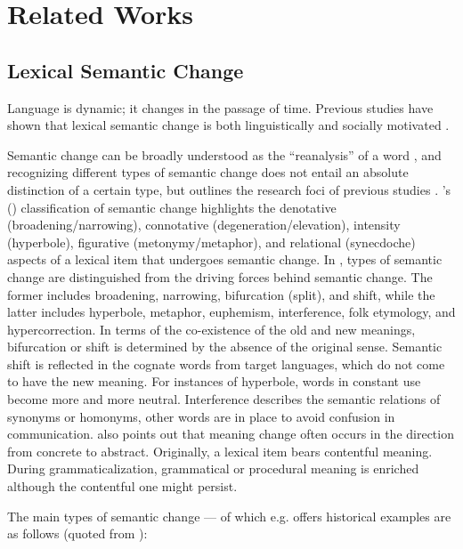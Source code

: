     

\chapter{Related Works}
\label{related_works}

\section{Lexical Semantic Change}
Language is dynamic; it changes in the passage of time. Previous studies have shown that lexical semantic change is both linguistically and socially motivated \parencite{kutuzov2017tracing,kutuzov2018survey,hamilton2016cultural}.

Semantic change can be broadly understood as the ``reanalysis'' of a word \parencite[650]{fortson2017approach}, and recognizing different types of semantic change does not entail an absolute distinction of a certain type, but outlines the research foci of previous studies \parencites[650]{fortson2017approach}{traugott2017semantic}. \citeauthor{bloomfield1933language}'s (\citeyear{bloomfield1933language}) classification of semantic change highlights the denotative (broadening/narrowing), connotative (degeneration/elevation), intensity (hyperbole), figurative (metonymy/metaphor), and relational (synecdoche) aspects of a lexical item that undergoes semantic change. In \textcite[199-205]{semanticincrowley2010}, types of semantic change are distinguished from the driving forces behind semantic change. The former includes broadening, narrowing, bifurcation (split), and shift, while the latter includes hyperbole, metaphor, euphemism, interference, folk etymology, and hypercorrection. In terms of the co-existence of the old and new meanings, bifurcation or shift is determined by the absence of the original sense. Semantic shift is reflected in the cognate words from target languages, which do not come to have the new meaning. For instances of hyperbole, words in constant use become more and more neutral. Interference describes the semantic relations of synonyms or homonyms, other words are in place to avoid confusion in communication. \textcite[81]{traugott2001regularity} also points out that meaning change often occurs in the direction from concrete to abstract. Originally, a lexical item bears contentful meaning. During grammaticalization, grammatical or procedural meaning is enriched although the contentful one might persist.

The main types of semantic change — of which e.g. \textcite{traugott2017semantic} offers historical examples are as follows (quoted from \parencite[6]{giulianelli2019lexical}):

